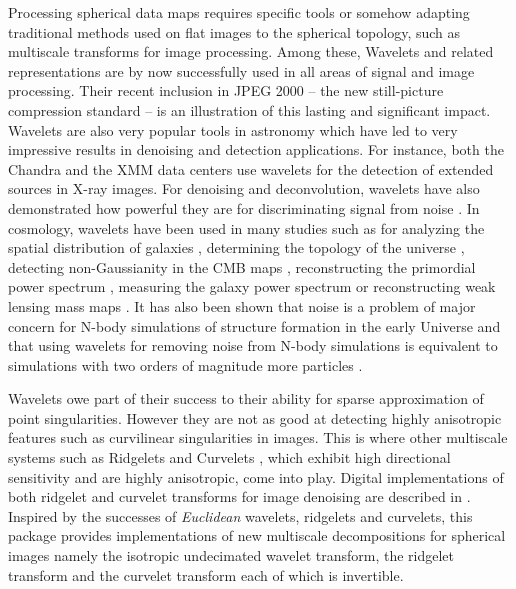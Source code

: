 Processing spherical data maps requires specific tools or somehow adapting traditional methods used on flat images to the spherical 
topology, such as multiscale transforms for image processing. Among these, Wavelets and related representations are by now successfully 
used in all areas of signal and image processing. Their recent inclusion in JPEG 2000 -- the new still-picture compression standard -- 
is an illustration of this lasting and significant impact. Wavelets are also very popular tools in astronomy \cite{starck:book02} which 
have led to very impressive results in denoising and detection applications. For instance, both the Chandra and the XMM data centers 
use wavelets for the detection of extended sources in X-ray images. For denoising and deconvolution, wavelets have also demonstrated 
how powerful they are for discriminating signal from noise \cite{starck:sta02_2}. In cosmology, wavelets have been used in many studies 
such as for analyzing the spatial distribution of galaxies \cite{astro:slezak93,astro:escalera95,starck:sta05,starck:martinez05}, 
determining the topology of the universe \cite{astro:rocha04}, detecting non-Gaussianity in the CMB maps \cite{gauss:aghanim99,gauss:barreiro01_1,wave:vielva04,starck:sta03_1},
reconstructing the primordial power spectrum \cite{astro:pia03}, measuring the galaxy power spectrum \cite{astro:fang00} or reconstructing 
weak lensing mass maps \cite{starck:sta05b}. It has also been shown that noise is a problem of major concern for N-body simulations of 
structure formation in the early Universe and that using wavelets for removing noise from N-body simulations is equivalent to simulations 
with two orders of magnitude more particles \cite{rest:romeo03,rest:romeo04}. 

Wavelets owe part of their success to their ability for sparse approximation of point singularities. However they are not as good at detecting 
highly anisotropic features such as curvilinear singularities in images. This is where other multiscale systems such as Ridgelets \cite{cur:candes99_1} 
and Curvelets \cite{cur:donoho99,starck:sta01_3}, which exhibit high directional sensitivity and are highly anisotropic, come into play. Digital 
implementations of both ridgelet and curvelet transforms for image denoising are described in \cite{starck:sta01_3}. Inspired by the successes 
of \emph{Euclidean} wavelets, ridgelets and curvelets, this package provides implementations of new multiscale decompositions for spherical images 
namely the isotropic undecimated wavelet transform, the ridgelet transform and the curvelet transform each of which is invertible.

